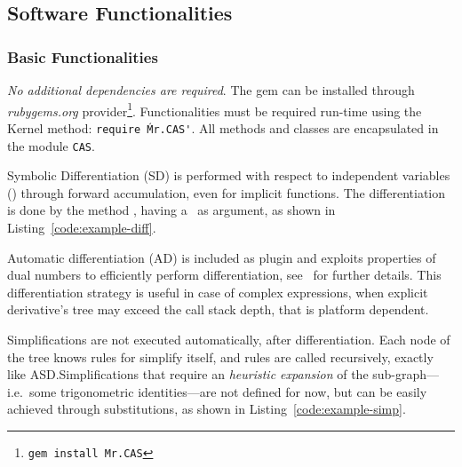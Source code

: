 \subsection{Software Functionalities}
\label{sec:functionalities}

\subsubsection{Basic Functionalities}

\emph{No additional dependencies are required}. The gem can be installed through \emph{rubygems.org} provider\footnote{\texttt{gem install Mr.CAS}}. Functionalities must be required run-time using the Kernel method: \texttt{require \'Mr.CAS\'}. All methods and classes are encapsulated in the module \texttt{CAS}.


Symbolic Differentiation (SD) is performed with respect to independent variables (\CASVariable) through forward accumulation, even for implicit functions. The differentiation is done by the method \CASOpdiff, having a \CASVariable~as argument, as shown in Listing~\ref{code:example-diff}.

\noindent%


Automatic differentiation (AD) is included as plugin and exploits properties of dual numbers to efficiently perform differentiation, see~\cite{bartholomew2000automatic} for further details. This differentiation strategy is useful in case of complex expressions, when explicit derivative's tree may exceed the call stack depth, that is platform dependent.

Simplifications are not executed automatically, after differentiation. Each node of the tree knows rules for simplify itself, and rules are called recursively, exactly like ASD.\@ Simplifications that require an \emph{heuristic expansion} of the sub-graph---i.e.\ some trigonometric identities---are not defined for now, but can be easily achieved through substitutions, as shown in Listing~\ref{code:example-simp}.

